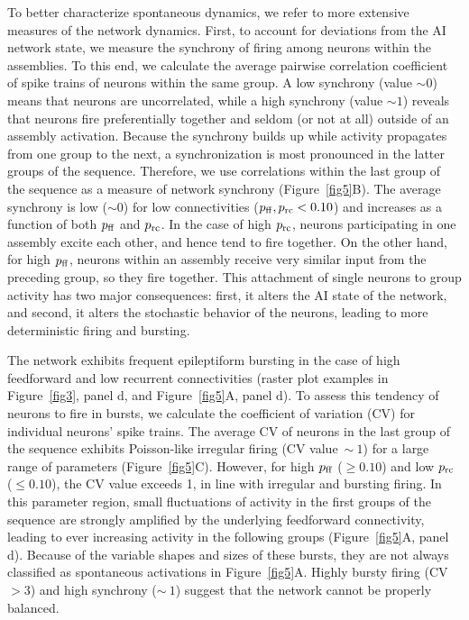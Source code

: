     To better characterize spontaneous dynamics, we refer to more extensive
    measures of the network dynamics. First, to account for deviations from the
    AI network state, we measure the synchrony of firing among neurons within
    the assemblies. To this end, we calculate the average pairwise correlation
    coefficient of spike trains of neurons within the same group. A low
    synchrony (value $\sim 0$) means that neurons are uncorrelated, while a
    high synchrony (value $\sim 1$) reveals that neurons fire preferentially
    together and seldom (or not at all) outside of an assembly activation.
    Because the synchrony builds up while activity propagates from one group to
    the next, a synchronization is most pronounced in the latter groups of the
    sequence. Therefore, we use correlations within the last group of the
    sequence as a measure of network synchrony (Figure~\ref{fig5}B). The average
    synchrony is low ($\sim 0$) for low connectivities ($p_{\rm ff},p_{\rm rc}
    < 0.10$) and increases as a function of both $p_{\rm ff}$ and $p_{\rm rc}$.
    In the case of high $p_{\rm rc}$, neurons participating in one assembly
    excite each other, and hence tend to fire together. On the other hand, for
    high $p_{\rm ff}$, neurons within an assembly receive very similar input
    from the preceding group, so they fire together. This attachment of single
    neurons to group activity has two major consequences: first, it alters the
    AI state of the network, and second, it alters the stochastic behavior of
    the neurons, leading to more deterministic firing and bursting.

    The network exhibits frequent epileptiform bursting in the case of high
    feedforward and low recurrent connectivities (raster plot examples in
    Figure~\ref{fig3}, panel d, and Figure~\ref{fig5}A, panel d). To assess this
    tendency of neurons to fire in bursts, we calculate the coefficient of
    variation (CV) for individual neurons' spike trains. The average CV of
    neurons in the last group of the sequence exhibits Poisson-like irregular
    firing (CV value~$\sim~1$) for a large range of parameters
    (Figure~\ref{fig5}C). However, for high $p_{\rm ff}$ ($\ge 0.10$) and low
    $p_{\rm rc}$ ($\le 0.10$), the CV value exceeds 1, in line with irregular
    and bursting firing. In this parameter region, small fluctuations of
    activity in the first groups of the sequence are strongly amplified by the
    underlying feedforward connectivity, leading to ever increasing activity in
    the following groups (Figure~\ref{fig5}A, panel d). Because of the variable
    shapes and sizes of these bursts, they are not always classified as
    spontaneous activations in Figure~\ref{fig5}A. Highly bursty firing (CV $>3$)
    and high synchrony ($\sim~1$) suggest that the network cannot be properly
    balanced.

